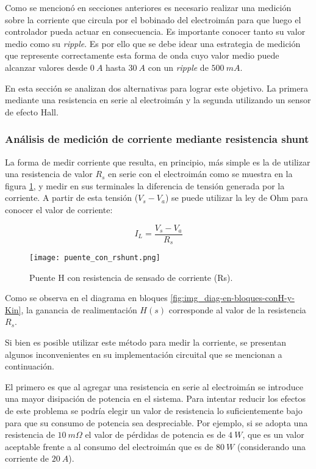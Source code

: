 Como se mencionó en secciones anteriores es necesario realizar una medición sobre la corriente que circula por el bobinado del electroimán para que luego el controlador pueda actuar en consecuencia. Es importante conocer tanto su valor medio como su \textsl{ripple}. Es por ello que se debe idear una estrategia de medición que represente correctamente esta forma de onda cuyo valor medio puede alcanzar valores desde $0\:A$ hasta $30\:A$ con un \textsl{ripple} de $500\:mA$.

En esta sección se analizan dos alternativas para lograr este objetivo. La primera mediante una resistencia en serie al electroimán y la segunda utilizando un sensor de efecto Hall.


\subsubsection{Análisis de medición de corriente mediante resistencia shunt}
La forma de medir corriente que resulta, en principio, más simple es la de utilizar una resistencia de valor $R_s$ en serie con el electroimán como se muestra en la figura \ref{fig:img_puente_con_rshunt}, y medir en sus terminales la diferencia de tensión generada por la corriente. A partir de esta tensión ($V_s-V_a$) se puede utilizar la ley de Ohm para conocer el valor de corriente:

\begin{equation}
	I_L=\frac{V_s-V_a}{R_s}
\end{equation}

\begin{figure}[H]
	\centering
	\texttt{[image: puente\_con\_rshunt.png]}
	\caption{Puente H con resistencia de sensado de corriente (Rs).}
	\label{fig:img_puente_con_rshunt}
\end{figure}

Como se observa en el diagrama en bloques \ref{fig:img_diag-en-bloques-conH-y-Kin}, la ganancia de realimentación $H(s)$ corresponde al valor de la resistencia $R_s$.

Si bien es posible utilizar este método para medir la corriente, se presentan algunos inconvenientes en su implementación circuital que se mencionan a continuación.

El primero es que al agregar una resistencia en serie al electroimán se introduce una mayor disipación de potencia en el sistema. Para intentar reducir los efectos de este problema se podría elegir un valor de resistencia lo suficientemente bajo para que su consumo de potencia sea despreciable. Por ejemplo, si se adopta una resistencia de $10\:m\Omega$ el valor de pérdidas de potencia es de $4\:W$, que es un valor aceptable frente a al consumo del electroimán que es de $80\:W$ (considerando una corriente de $20\:A$).

